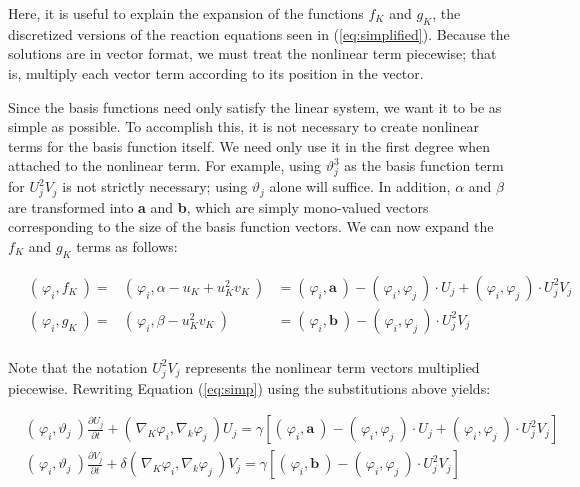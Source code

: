\documentclass[12pt]{article}
\begin{document}
Here, it is useful to explain the expansion of the functions $f_K$ and $g_K$, the discretized versions of the reaction equations seen in (\ref{eq:simplified}). Because the solutions are in vector format, we must treat the nonlinear term piecewise; that is, multiply each vector term according to its position in the vector. 

Since the basis functions need only satisfy the linear system, we want it to be as simple as possible. To accomplish this, it is not necessary to create nonlinear terms for the basis function itself. We need only use it in the first degree when attached to the nonlinear term. For example, using $\vartheta_j^3$ as the basis function term for $U_j^2V_j$ is not strictly necessary; using $\vartheta_j$ alone will suffice. In addition, $\alpha$ and $\beta$  are transformed into \textbf{a} and \textbf{b}, which are simply mono-valued vectors corresponding to the size of the basis function vectors. We can now expand the $f_K$ and $g_K$ terms as follows:

\begin{equation}
\begin{aligned}
~&\left(\frac{}{}\varphi_i, f_K~\right)  =& \left(\frac{}{}\varphi_i, \alpha- u_K+ u_K^2v_K~\right)  &= \left(\frac{}{}\varphi_i, \textbf{a} ~\right) - \left(\frac{}{}\varphi_i, \varphi_j ~\right)\cdot U_j + \left(\frac{}{}\varphi_i, \varphi_j ~\right)\cdot U_j^2V_j\\
~&\left(\frac{}{}\varphi_i, g_K~\right)  =& \left(\frac{}{}\varphi_i, \beta- u_K^2v_K~\right) ~~~~ &= \left(\frac{}{}\varphi_i, \textbf{b} ~\right) - \left(\frac{}{}\varphi_i, \varphi_j ~\right)\cdot U_j^2V_j\\
\end{aligned}
\end{equation}

\noindent Note that the notation $U_j^2V_j$ represents the nonlinear term vectors multiplied piecewise. Rewriting Equation (\ref{eq:simp}) using the substitutions above yields:

\begin{equation}\label{eq:simp-full}
\begin{aligned}
&\left(\frac{}{}\varphi_i,\vartheta_j~\right)\frac{\partial U_j}{\partial t} + \left(\frac{}{}\nabla_K\varphi_i, \nabla_k\varphi_j~\right) U_j = \gamma \left[\left(\frac{}{}\varphi_i, \textbf{a} ~\right) - \left(\frac{}{}\varphi_i, \varphi_j ~\right)\cdot U_j + \left(\frac{}{}\varphi_i, \varphi_j ~\right)\cdot U_j^2V_j\right] \\
&\left(\frac{}{}\varphi_i,\vartheta_j~\right)\frac{\partial V_j}{\partial t} + \delta\left(\frac{}{}\nabla_K\varphi_i, \nabla_k\varphi_j~\right) V_j = \gamma \left[\left(\frac{}{}\varphi_i, \textbf{b} ~\right) - \left(\frac{}{}\varphi_i, \varphi_j ~\right)\cdot U_j^2V_j\right]
\end{aligned}	
\end{equation}
\end{document}
